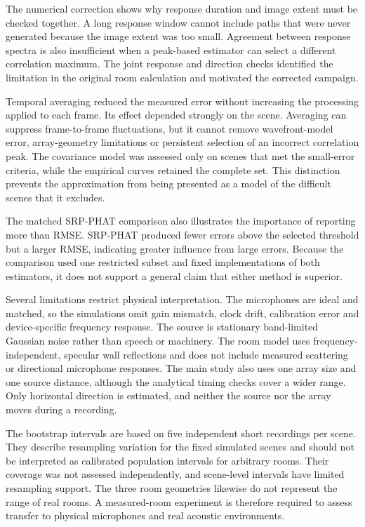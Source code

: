 \documentclass{edpsci}
\begin{document}
The numerical correction shows why response duration and image extent must be checked together. A long response window cannot include paths that were never generated because the image extent was too small. Agreement between response spectra is also insufficient when a peak-based estimator can select a different correlation maximum. The joint response and direction checks identified the limitation in the original room calculation and motivated the corrected campaign.

Temporal averaging reduced the measured error without increasing the processing applied to each frame. Its effect depended strongly on the scene. Averaging can suppress frame-to-frame fluctuations, but it cannot remove wavefront-model error, array-geometry limitations or persistent selection of an incorrect correlation peak. The covariance model was assessed only on scenes that met the small-error criteria, while the empirical curves retained the complete set. This distinction prevents the approximation from being presented as a model of the difficult scenes that it excludes.

The matched SRP-PHAT comparison \citep{dibiase} also illustrates the importance of reporting more than RMSE. SRP-PHAT produced fewer errors above the selected threshold but a larger RMSE, indicating greater influence from large errors. Because the comparison used one restricted subset and fixed implementations of both estimators, it does not support a general claim that either method is superior.

Several limitations restrict physical interpretation. The microphones are ideal and matched, so the simulations omit gain mismatch, clock drift, calibration error and device-specific frequency response. The source is stationary band-limited Gaussian noise rather than speech or machinery. The room model uses frequency-independent, specular wall reflections and does not include measured scattering or directional microphone responses. The main study also uses one array size and one source distance, although the analytical timing checks cover a wider range. Only horizontal direction is estimated, and neither the source nor the array moves during a recording.

The bootstrap intervals are based on five independent short recordings per scene. They describe resampling variation for the fixed simulated scenes and should not be interpreted as calibrated population intervals for arbitrary rooms. Their coverage was not assessed independently, and scene-level intervals have limited resampling support. The three room geometries likewise do not represent the range of real rooms. A measured-room experiment is therefore required to assess transfer to physical microphones and real acoustic environments.
\end{document}
